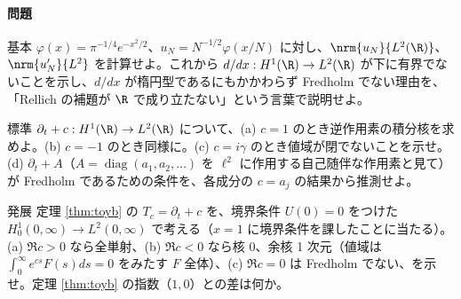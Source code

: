 \paragraph{問題}
\begin{prob}{基本}\label{p:weyl}
$\varphi(x)=\pi^{-1/4}e^{-x^2/2}$、$u_N=N^{-1/2}\varphi(x/N)$ に対し、$\nrm{u_N}{L^2(\R)}$、$\nrm{u_N'}{L^2}$ を計算せよ。これから $d/dx:H^1(\R)\to L^2(\R)$ が下に有界でないことを示し、$d/dx$ が楕円型であるにもかかわらず Fredholm でない理由を、「Rellich の補題が $\R$ で成り立たない」という言葉で説明せよ。
\end{prob}
\begin{prob}{標準}\label{p:cyl}
$\partial_t+c:H^1(\R)\to L^2(\R)$ について、(a) $c=1$ のとき逆作用素の積分核を求めよ。(b) $c=-1$ のとき同様に。(c) $c=i\gamma$ のとき値域が閉でないことを示せ。(d) $\partial_t+A$（$A=\operatorname{diag}(a_1,a_2,\dots)$ を $\ell^2$ に作用する自己随伴な作用素と見て）が Fredholm であるための条件を、各成分の $c=a_j$ の結果から推測せよ。
\end{prob}
\begin{prob}{発展}\label{p:toydirichlet}
定理 \ref{thm:toyb} の $T_c=\partial_t+c$ を、境界条件 $U(0)=0$ をつけた $H^1_0(0,\infty)\to L^2(0,\infty)$ で考える（$x=1$ に境界条件を課したことに当たる）。(a) $\Re c>0$ なら全単射、(b) $\Re c<0$ なら核 $0$、余核 1 次元（値域は $\int_0^\infty e^{cs}F(s)ds=0$ をみたす $F$ 全体）、(c) $\Re c=0$ は Fredholm でない、を示せ。定理 \ref{thm:toyb} の指数（$1,0$）との差は何か。
\end{prob}
